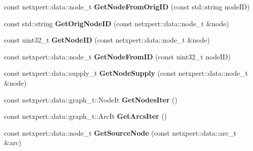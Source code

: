\begin{DoxyCompactItemize}
\item 
const netxpert\+::data\+::node\+\_\+t {\bfseries Get\+Node\+From\+Orig\+ID} (const std\+::string node\+ID)\hypertarget{classnetxpert_1_1InternalNet_a05884dc72ebd5e768f7dd1c296811360}{}\label{classnetxpert_1_1InternalNet_a05884dc72ebd5e768f7dd1c296811360}

\item 
const std\+::string {\bfseries Get\+Orig\+Node\+ID} (const netxpert\+::data\+::node\+\_\+t \&node)\hypertarget{classnetxpert_1_1InternalNet_a7289c17bde0c31a1856069db1eaf392a}{}\label{classnetxpert_1_1InternalNet_a7289c17bde0c31a1856069db1eaf392a}

\item 
const uint32\+\_\+t {\bfseries Get\+Node\+ID} (const netxpert\+::data\+::node\+\_\+t \&node)\hypertarget{classnetxpert_1_1InternalNet_a016dca35f3551596e8dcee9af4810091}{}\label{classnetxpert_1_1InternalNet_a016dca35f3551596e8dcee9af4810091}

\item 
const netxpert\+::data\+::node\+\_\+t {\bfseries Get\+Node\+From\+ID} (const uint32\+\_\+t node\+ID)\hypertarget{classnetxpert_1_1InternalNet_a18be0ed9fc7136a58cbb9c3255470a50}{}\label{classnetxpert_1_1InternalNet_a18be0ed9fc7136a58cbb9c3255470a50}

\item 
const netxpert\+::data\+::supply\+\_\+t {\bfseries Get\+Node\+Supply} (const netxpert\+::data\+::node\+\_\+t \&node)\hypertarget{classnetxpert_1_1InternalNet_a2e4c7863165a03f9a630417b1266b5b6}{}\label{classnetxpert_1_1InternalNet_a2e4c7863165a03f9a630417b1266b5b6}

\item 
const netxpert\+::data\+::graph\+\_\+t\+::\+Node\+It {\bfseries Get\+Nodes\+Iter} ()\hypertarget{classnetxpert_1_1InternalNet_ae25db254fd5fc5396ab1004880a3d834}{}\label{classnetxpert_1_1InternalNet_ae25db254fd5fc5396ab1004880a3d834}

\item 
const netxpert\+::data\+::graph\+\_\+t\+::\+Arc\+It {\bfseries Get\+Arcs\+Iter} ()\hypertarget{classnetxpert_1_1InternalNet_a7db1dd34c730eaf24ff90cf0c92f0ff6}{}\label{classnetxpert_1_1InternalNet_a7db1dd34c730eaf24ff90cf0c92f0ff6}

\item 
const netxpert\+::data\+::node\+\_\+t {\bfseries Get\+Source\+Node} (const netxpert\+::data\+::arc\+\_\+t \&arc)\hypertarget{classnetxpert_1_1InternalNet_adb82b20b3ca95c20a1c2b8ef3ca76a29}{}\label{classnetxpert_1_1InternalNet_adb82b20b3ca95c20a1c2b8ef3ca76a29}


\end{DoxyCompactItemize}
